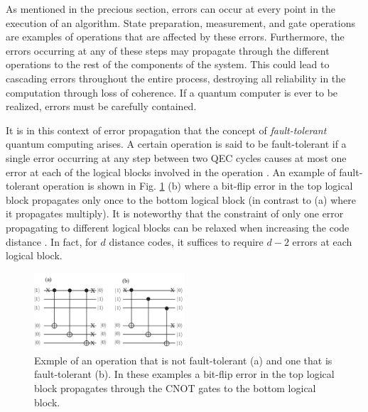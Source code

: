 As mentioned in the precious section, errors can occur at every point in the
execution of an algorithm. State preparation, measurement, and gate operations
are examples of operations that are affected by these errors. Furthermore, the
errors occurring at any of these steps may propagate through the different
operations to the rest of the components of the system. This could lead to
cascading errors throughout the entire process, destroying all reliability in
the computation through loss of coherence. If a quantum computer is ever to be
realized, errors must be carefully contained.

It is in this context of error propagation that the concept of
\textit{fault-tolerant} quantum computing arises. A certain operation is said to
be fault-tolerant if a single error occurring at any step between two QEC cycles
causes at most one error at each of the logical blocks involved in the operation
\cite{Devitt_2013}. An example of fault-tolerant operation is shown in Fig.
\ref{fig:fault_tol} (b) where a bit-flip error in the top logical block
propagates only once to the bottom logical block (in contrast to (a) where it
propagates multiply). It is noteworthy that the constraint of only one
error propagating to different logical blocks can be relaxed when increasing the
code distance \cite{Devitt_2013}. In fact, for $d$ distance codes, it suffices
to require $d-2$ errors at each logical block.

\begin{figure}[htbp]
  \centering
  \includegraphics[width=0.5\textwidth]{images/fault_tolerance.pdf}
  \caption{Exmple of an operation that is not fault-tolerant (a) and one that is
    fault-tolerant (b). In these examples a bit-flip error in the top logical
    block propagates through the CNOT gates to the bottom logical block.}
  \label{fig:fault_tol}
\end{figure}

